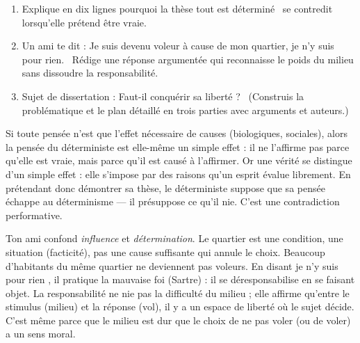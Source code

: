 \documentclass[11pt]{article}
\newcommand{\cle}[1]{{\popxbold\color{popdark}#1}}
\begin{document}
\begin{exercice}
\begin{enumerate}
\item Explique en dix lignes pourquoi la thèse \guillemotleft tout est déterminé \guillemotright\ se contredit lorsqu'elle prétend être vraie.
\item Un ami te dit : \guillemotleft Je suis devenu voleur à cause de mon quartier, je n'y suis pour rien. \guillemotright\ Rédige une réponse argumentée qui reconnaisse le poids du milieu sans dissoudre la responsabilité.
\item Sujet de dissertation : \guillemotleft Faut-il conquérir sa liberté ? \guillemotright\ (Construis la problématique et le plan détaillé en trois parties avec arguments et auteurs.)
\end{enumerate}
\end{exercice}

\begin{corrige}[Exercice 1]
Si toute pensée n'est que l'effet nécessaire de causes (biologiques, sociales), alors la pensée du déterministe est elle-même un simple effet : il ne l'affirme pas parce qu'elle est vraie, mais parce qu'il est causé à l'affirmer. Or une vérité se distingue d'un simple effet : elle s'impose par des raisons qu'un esprit évalue librement. En prétendant donc démontrer sa thèse, le déterministe suppose que sa pensée échappe au déterminisme — il présuppose ce qu'il nie. C'est une contradiction performative.
\end{corrige}

\begin{corrige}
Ton ami confond \emph{influence} et \emph{détermination}. Le quartier est une condition, une situation (facticité), pas une cause suffisante qui annule le choix. Beaucoup d'habitants du même quartier ne deviennent pas voleurs. En disant \guillemotleft je n'y suis pour rien \guillemotright, il pratique la \cle{mauvaise foi} (Sartre) : il se déresponsabilise en se faisant objet. La responsabilité ne nie pas la difficulté du milieu ; elle affirme qu'entre le stimulus (milieu) et la réponse (vol), il y a un espace de liberté où le sujet décide. C'est même parce que le milieu est dur que le choix de ne pas voler (ou de voler) a un sens moral.
\end{corrige}
\end{document}
